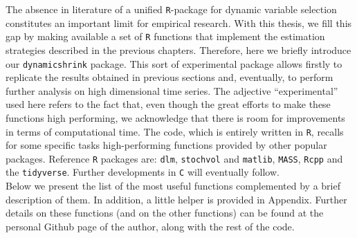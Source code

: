 \documentclass[
  12pt,
]{book}
\theoremstyle{break}
\theoremstyle{nonumberplain}
\begin{document}
The absence in literature of a unified \texttt{R}-package for dynamic
variable selection constitutes an important limit for empirical
research. With this thesis, we fill this gap by making available a set
of \texttt{R} functions that implement the estimation strategies
described in the previous chapters. Therefore, here we briefly introduce
our \texttt{dynamicshrink} package. This sort of experimental package
allows firstly to replicate the results obtained in previous sections
and, eventually, to perform further analysis on high dimensional time
series. The adjective ``experimental'' used here refers to the fact
that, even though the great efforts to make these functions high
performing, we acknowledge that there is room for improvements in terms
of computational time. The code, which is entirely written in
\texttt{R}, recalls for some specific tasks high-performing functions
provided by other popular packages. Reference \texttt{R} packages are:
\texttt{dlm}, \texttt{stochvol} and \texttt{matlib}, \texttt{MASS},
\texttt{Rcpp} and the \texttt{tidyverse}. Further developments in
\texttt{C} will eventually follow.\\
Below we present the list of the most useful functions complemented by a
brief description of them. In addition, a little helper is provided in
Appendix. Further details on these functions (and on the other
functions) can be found at the personal Github page of the author, along
with the rest of the code.
\end{document}
